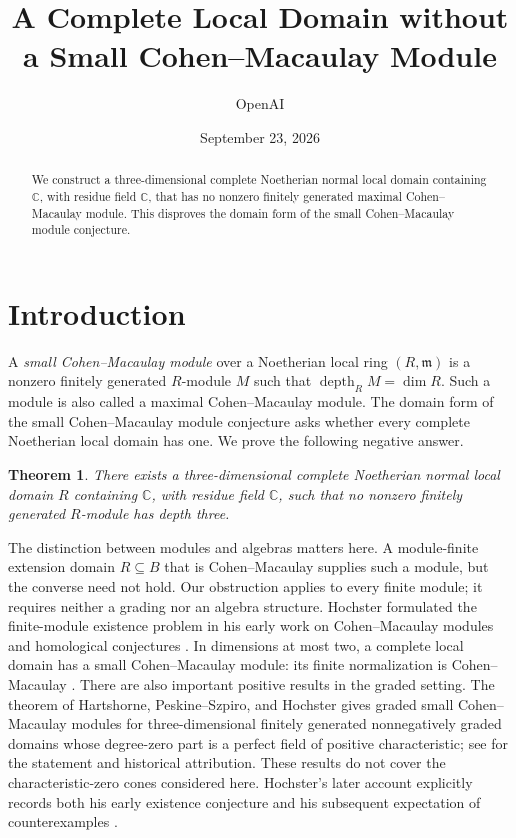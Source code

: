 \documentclass[11pt]{article}
\title{A Complete Local Domain without\\a Small Cohen--Macaulay Module}
\author{OpenAI}
\date{September 23, 2026}
\newtheorem{theorem}{Theorem}[section]
\theoremstyle{remark}
\newcommand{\C}{\mathbb C}
\DeclareMathOperator{\depth}{depth}
\begin{document}
\maketitle
\begin{abstract}
We construct a three-dimensional complete Noetherian normal local domain
containing $\C$, with residue field $\C$, that has no nonzero finitely generated
maximal Cohen--Macaulay module. This disproves the domain form of the small
Cohen--Macaulay module conjecture.
\end{abstract}
\tableofcontents
\clearpage

\section{Introduction}
A \emph{small Cohen--Macaulay module} over a Noetherian local ring $(R,\mathfrak m)$
is a nonzero finitely generated $R$-module $M$ such that
$\depth_R M=\dim R$. Such a module is also called a maximal Cohen--Macaulay
module. The domain form of the small Cohen--Macaulay module conjecture asks
whether every complete Noetherian local domain has one.
We prove the following negative answer.

\begin{theorem}\label{thm:main}
There exists a three-dimensional complete Noetherian normal local domain
$R$ containing $\C$, with residue field $\C$, such that no nonzero finitely
generated $R$-module has depth three.
\end{theorem}

The distinction between modules and algebras matters here. A module-finite extension domain $R\subseteq B$ that is
Cohen--Macaulay supplies such a module, but the converse need not hold. Our obstruction applies to every finite module;
it requires neither a grading nor an algebra structure.
Hochster formulated the finite-module existence problem in his early
work on Cohen--Macaulay modules and homological conjectures
\cite{Hochster1973,Hochster1975}. In dimensions at most two, a complete
local domain has a small Cohen--Macaulay module: its finite normalization
is Cohen--Macaulay \cite[Section~2]{Hochster2017}. There are also important
positive results in the graded setting. The theorem of Hartshorne,
Peskine--Szpiro, and Hochster gives graded small Cohen--Macaulay modules
for three-dimensional finitely generated nonnegatively graded domains
whose degree-zero part is a perfect field of positive characteristic; see
\cite[Theorem~5.2]{HochsterYao2023} for the statement and historical
attribution. These results do not cover the characteristic-zero cones
considered here. Hochster's later account explicitly records both his
early existence conjecture and his subsequent expectation of counterexamples
\cite[Section~2, Conjectures~2.1 and 2.2]{Hochster2017}.
\end{document}
